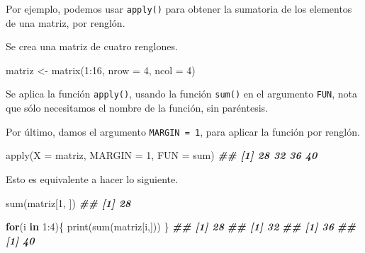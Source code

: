 \documentclass[
]{book}
\newenvironment{Shaded}{\begin{snugshade}}{\end{snugshade}}
\newcommand{\AttributeTok}[1]{\textcolor[rgb]{0.77,0.63,0.00}{#1}}
\newcommand{\ControlFlowTok}[1]{\textcolor[rgb]{0.13,0.29,0.53}{\textbf{#1}}}
\newcommand{\DecValTok}[1]{\textcolor[rgb]{0.00,0.00,0.81}{#1}}
\newcommand{\DocumentationTok}[1]{\textcolor[rgb]{0.56,0.35,0.01}{\textbf{\textit{#1}}}}
\newcommand{\FunctionTok}[1]{\textcolor[rgb]{0.00,0.00,0.00}{#1}}
\newcommand{\NormalTok}[1]{#1}
\newcommand{\OtherTok}[1]{\textcolor[rgb]{0.56,0.35,0.01}{#1}}
\newcommand{\SpecialCharTok}[1]{\textcolor[rgb]{0.00,0.00,0.00}{#1}}
\begin{document}
Por ejemplo, podemos usar \texttt{apply()} para obtener la sumatoria de los elementos de una matriz, por renglón.

Se crea una matriz de cuatro renglones.

\begin{Shaded}
\begin{Highlighting}[]
\NormalTok{matriz }\OtherTok{\textless{}{-}} \FunctionTok{matrix}\NormalTok{(}\DecValTok{1}\SpecialCharTok{:}\DecValTok{16}\NormalTok{, }\AttributeTok{nrow =} \DecValTok{4}\NormalTok{, }\AttributeTok{ncol =} \DecValTok{4}\NormalTok{) }
\end{Highlighting}
\end{Shaded}

Se aplica la función \texttt{apply()}, usando la función \texttt{sum()} en el argumento \texttt{FUN}, nota que sólo necesitamos el nombre de la función, sin paréntesis.

Por último, damos el argumento \texttt{MARGIN\ =\ 1}, para aplicar la función por renglón.

\begin{Shaded}
\begin{Highlighting}[]
\FunctionTok{apply}\NormalTok{(}\AttributeTok{X =}\NormalTok{ matriz, }\AttributeTok{MARGIN =} \DecValTok{1}\NormalTok{, }\AttributeTok{FUN =}\NormalTok{ sum)}
\DocumentationTok{\#\# [1] 28 32 36 40}
\end{Highlighting}
\end{Shaded}

Esto es equivalente a hacer lo siguiente.

\begin{Shaded}
\begin{Highlighting}[]
\FunctionTok{sum}\NormalTok{(matriz[}\DecValTok{1}\NormalTok{, ])}
\DocumentationTok{\#\# [1] 28}
\end{Highlighting}
\end{Shaded}

\begin{Shaded}
\begin{Highlighting}[]
\ControlFlowTok{for}\NormalTok{(i }\ControlFlowTok{in} \DecValTok{1}\SpecialCharTok{:}\DecValTok{4}\NormalTok{)\{}
  \FunctionTok{print}\NormalTok{(}\FunctionTok{sum}\NormalTok{(matriz[i,]))}
\NormalTok{\}}
\DocumentationTok{\#\# [1] 28}
\DocumentationTok{\#\# [1] 32}
\DocumentationTok{\#\# [1] 36}
\DocumentationTok{\#\# [1] 40}
\end{Highlighting}
\end{Shaded}
\end{document}
